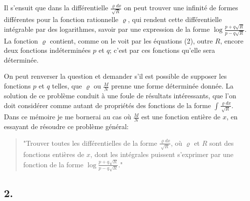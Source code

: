 \documentclass[oneside, 12 pt, leqno]{memoir}
\begin{document}
Il s'ensuit que dans la différentielle \(\frac{\varrho d x}{\sqrt{R}}\) on peut trouver une infinité de formes différentes pour la fonction rationnelle \(\varrho\), qui rendent cette différentielle intégrable par des logarithmes, savoir par une expression de la forme \(\log \frac{p+q \sqrt{R}}{p-q \sqrt{R}}\). La fonction \(\varrho\) contient, comme on le voit par les équations (2), outre \(R\), encore deux fonctions indéterminées \(p\) et \(q\); c'est par ces fonctions qu'elle sera déterminée.

On peut renverser la question et demander s'il est possible de supposer les fonctions \(p\) et \(q\) telles, que \(\varrho\) ou \(\frac{M}{N}\) prenne une forme déterminée donnée. La solution de ce problème conduit à une foule de résultats intéressants, que l'on doit considérer comme autant de propriétés des fonctions de la forme \(\int \frac{\varrho d x}{\sqrt{R}}\). Dans ce mémoire je me bornerai au cas où \(\frac{M}{N}\) est une fonction entière de \(x\), en essayant de résoudre ce problème général:

\begin{quote}"Trouver toutes les différentielles de la forme \(\frac{\varrho d x}{\sqrt{R}}\), où \(\varrho\) et \(R\) sont des fonctions entières de \(x\), dont les intégrales puissent s'exprimer par une fonction de la forme \(\log \frac{p+q \sqrt{R}}{p-q \sqrt{R}}\)."\end{quote} 

\subsection*{2.}
\end{document}
